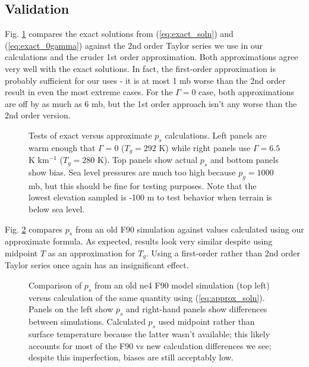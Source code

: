\subsection{Validation}

Fig. \ref{fig:exactVSapprox} compares the exact solutions from (\ref{eq:exact_soln}) and (\ref{eq:exact_0gamma}) against the 2nd order Taylor series we use in our calculations and the cruder 1st order approximation. Both approximations agree very well with the exact solutions. In fact, the first-order approximation is probably sufficient for our uses - it is at most 1 mb worse than the 2nd order result in even the most extreme cases. For the $\Gamma=0$ case, both approximations are off by as much as 6 mb, but the 1st order approach isn't any worse than the 2nd order version. 
\begin{figure}[ht]
\noindent
\centering
{}
\caption{Tests of exact versus approximate $p_s$ calculations. Left panels are warm enough that $\Gamma=0$ ($T_g=292$ K) while right panels use $\Gamma=6.5$ K km$^{-1}$ ($T_g=280$ K). Top panels show actual $p_s$ and bottom panels show bias. Sea level pressures are much too high because $p_g=1000$ mb, but this should be fine for testing purposes. Note that the lowest elevation sampled is -100 m to test behavior when terrain is below sea level.} 
\label{fig:exactVSapprox}
\end{figure}

Fig. \ref{fig:psl_vs_v0} compares $p_s$ from an old F90 simulation against values calculated using our approximate formula. As expected, results look very similar despite using midpoint $T$ as an approximation for $T_g$. Using a first-order rather than 2nd order Taylor series once again has an insignificant effect. 
\begin{figure}[ht]
\noindent
\centering
{}
\caption{Comparison of $p_s$ from an old ne4 F90 model simulation (top left) versus calculation of the same quantity using (\ref{eq:approx_soln}). Panels on the left show $p_s$ and right-hand panels show differences between simulations. Calculated $p_s$ used midpoint rather than surface temperature because the latter wasn't available; this likely accounts for most of the F90 vs new calculation differences we see; despite this imperfection, biases are still acceptably low.} 
\label{fig:psl_vs_v0}
\end{figure}

